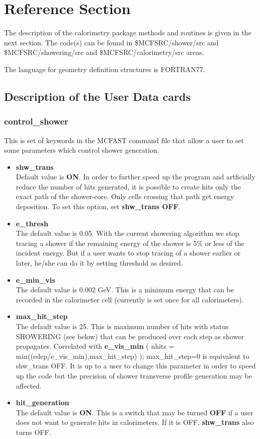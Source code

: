 \section{Reference Section}

The description of the calorimetry package methods and routines is given in the next section.
The code(s) can be found in \$MCFSRC/shower/src and \$MCFSRC/showering/src and \$MCFSRC/calorimetry/src areas. 

The language for geometry definition structures is FORTRAN77.

\subsection{Description of the User Data cards}
\subsubsection{control\_shower}
   This is set of keywords in the MCFAST command file that allow a user to set
   some parameters which control shower generation. 
\begin{itemize}
\item{ {\bf shw\_trans}\\   Default value is {\bf ON}.
   In order to further speed up the program and artficially reduce the number
   of hits generated, it is possible to create hits only the exact path 
   of the shower-core. Only cells crossing that path get energy deposition. 
 To set this option, set {\bf shw\_trans OFF}.} 
\item{ {\bf e\_thresh} \\
   The default value is 0.05.
   With the current showering algorithm we stop tracing a shower if the remaining energy
   of the shower is 5\% or less of the incident energy. But if a user wants to stop tracing 
   of a shower earlier or later, he/she can do it by setting threshold as desired.}
\item{ {\bf e\_min\_vis} \\
   The default value is 0.002 GeV. This is a minimum energy that can be recorded in 
   the calorimeter cell (currently is set once for all calorimeters). }
\item{ {\bf max\_hit\_step} \\
   The default value is 25. This is maximum number of hits with status SHOWERING (see below) 
   that can be produced over each step as shower propagates. Correlated with {\bf e\_vis\_min}
   ( nhits = min((edep/e\_vis\_min),max\_hit\_step) ); max\_hit\_step=0 is equivalent to
   shw\_trans OFF. It is up to a user to change this parameter in order to speed up the code
   but the precision of shower transverse profile generation may be affected.}
\item{ {\bf hit\_generation} \\
   The default value is {\bf ON}. This is a switch that may be turned {\bf OFF} if a user
   does not want to generate hits in calorimeters. If it is OFF, {\bf shw\_trans} also 
   turns OFF. }
\end{itemize}

